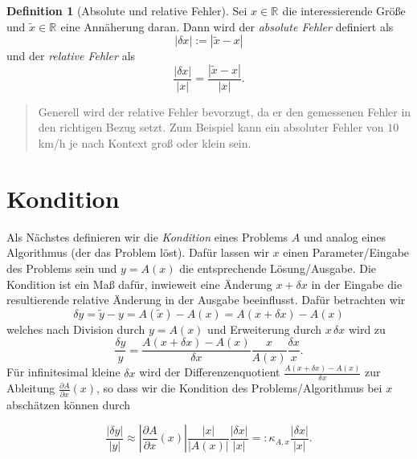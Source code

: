 \documentclass[
]{book}
\newenvironment {JHSAYS} [0] {\begin{quote}\color{jhsc}} {\end{quote}}
\theoremstyle{definition}
\newtheorem{definition}{Definition}[chapter]
\theoremstyle{definition}
\theoremstyle{definition}
\theoremstyle{definition}
\theoremstyle{remark}
\begin{document}
\begin{definition}[Absolute und relative Fehler]
\protect\hypertarget{def:errors}{}\label{def:errors}Sei \(x\in\mathbb R^{}\) die interessierende Größe und \(\tilde x \in \mathbb R^{}\) eine Annäherung daran. Dann wird der \emph{absolute Fehler} definiert als
\begin{equation*}
|\delta x|:=|\tilde x- x|
\end{equation*}
und der \emph{relative Fehler} als
\begin{equation*}
\frac{|\delta x|}{|x|}=\frac{|\tilde x- x|}{|x|}.
\end{equation*}
\end{definition}

\leavevmode\hypertarget{rem-rel-abs-err}{}%
\begin{JHSAYS}
Generell wird der relative Fehler bevorzugt, da er den gemessenen Fehler in den richtigen Bezug setzt. Zum Beispiel kann ein absoluter Fehler von \(10\) km/h je nach Kontext groß oder klein sein.

\end{JHSAYS}

\hypertarget{kondition}{%
\section{Kondition}\label{kondition}}

Als Nächstes definieren wir die \emph{Kondition} eines Problems \(A\) und analog eines Algorithmus (der das Problem löst). Dafür lassen wir \(x\) einen Parameter/Eingabe des Problems sein und \(y=A(x)\) die entsprechende Lösung/Ausgabe. Die Kondition ist ein Maß dafür, inwieweit eine Änderung \(x+\delta x\) in der Eingabe die resultierende relative Änderung in der Ausgabe beeinflusst. Dafür betrachten wir
\begin{equation*}
\delta y = \tilde y - y = A(\tilde x) - A(x) = A(x+\delta x) - A(x)
\end{equation*}
welches nach Division durch \(y=A(x)\) und Erweiterung durch \(x\,\delta x\) wird zu
\begin{equation*}
\frac{\delta y}{y} = \frac{A(x+\delta x)-A(x)}{\delta x}\frac{x}{A(x)}\frac{\delta x}{x}.
\end{equation*}
Für infinitesimal kleine \(\delta x\) wird der Differenzenquotient \(\frac{A(x+\delta x)-A(x)}{\delta x}\) zur Ableitung \(\frac{\partial A}{\partial x}(x)\), so dass wir die Kondition des Problems/Algorithmus bei \(x\) abschätzen können durch

\begin{equation}
\frac{|\delta y|}{|y|} \approx |\frac{\partial A}{\partial x}(x)|\frac{|x|}{|A(x)|}\frac{|\delta x|}{|x|}=:\kappa_{A,x}\frac{|\delta x|}{|x|}.
\label{eq:eqn-scalar-cond}
\end{equation}
\end{document}
